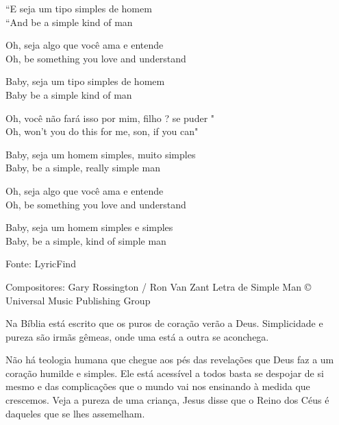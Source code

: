 ``E seja um tipo simples de homem \\
``And be a simple kind of man

Oh, seja algo que você ama e entende \\
Oh, be something you love and understand

Baby, seja um tipo simples de homem \\
Baby be a simple kind of man

Oh, você não fará isso por mim, filho ? se puder " \\
Oh, won't you do this for me, son, if you can"

Baby, seja um homem simples, muito simples \\
Baby, be a simple, really simple man

Oh, seja algo que você ama e entende \\
Oh, be something you love and understand

Baby, seja um homem simples e simples \\
Baby, be a simple, kind of simple man

Fonte: LyricFind

Compositores: Gary Rossington / Ron Van Zant
Letra de Simple Man © Universal Music Publishing Group

\emdash{}Na Bíblia está escrito que os puros de coração verão a Deus. Simplicidade e pureza são irmãs gêmeas, onde uma está a outra se aconchega.

\emdash{}Não há teologia humana que chegue aos pés das revelações que Deus faz a um coração humilde e simples. Ele está acessível a todos basta se despojar de si mesmo e das complicações que o mundo vai nos ensinando à medida que crescemos. Veja a pureza de uma criança, Jesus disse que o Reino dos Céus é daqueles que se lhes assemelham.